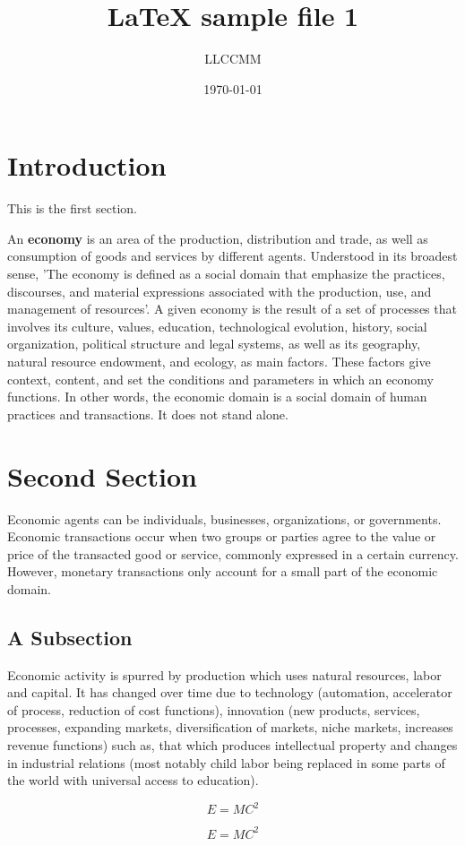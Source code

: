 \documentclass[12pt]{article}
\title{LaTeX sample file 1}
\author{LLCCMM}
\date{\today}
\begin{document}
\maketitle

\section{Introduction}

This is the first section.

An \textbf{economy} is an area of the production, distribution and trade, as well as consumption of goods and services by different agents. Understood in its broadest sense, 'The economy is defined as a social domain that emphasize the practices, discourses, and material expressions associated with the production, use, and management of resources'. A given economy is the result of a set of processes that involves its culture, values, education, technological evolution, history, social organization, political structure and legal systems, as well as its geography, natural resource endowment, and ecology, as main factors. These factors give context, content, and set the conditions and parameters in which an economy functions. In other words, the economic domain is a social domain of human practices and transactions. It does not stand alone.

\section{Second Section}

Economic agents can be individuals, businesses, organizations, or governments. Economic transactions occur when two groups or parties agree to the value or price of the transacted good or service, commonly expressed in a certain currency. However, monetary transactions only account for a small part of the economic domain.

\subsection{A Subsection}

{\Large Economic activity is spurred by production which uses natural resources, labor and capital. It has changed over time due to technology (automation, accelerator of process, reduction of cost functions), innovation (new products, services, processes, expanding markets, diversification of markets, niche markets, increases revenue functions) such as, that which produces intellectual property and changes in industrial relations (most notably child labor being replaced in some parts of the world with universal access to education).}

\begin{equation}
E = MC^{2}
\end{equation}

\begin{equation*}
E = MC^{2}
\end{equation*}
\end{document}
